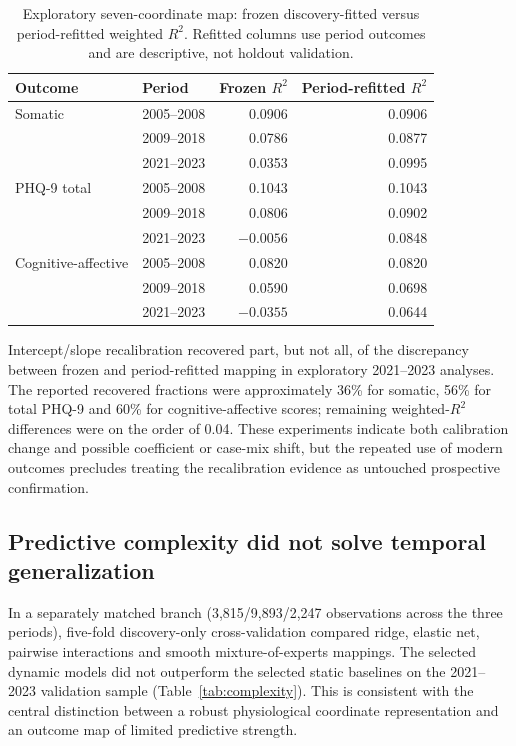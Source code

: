 \documentclass[11pt,a4paper]{article}
\newcommand{\Rtwo}{R^{2}}
\begin{document}
\begin{table}[htbp]\centering\small
\caption{Exploratory seven-coordinate map: frozen discovery-fitted versus period-refitted weighted $\Rtwo$. Refitted columns use period outcomes and are descriptive, not holdout validation.}
\label{tab:transfer}
\begin{tabular}{llrr}\toprule
Outcome & Period & Frozen $\Rtwo$ & Period-refitted $\Rtwo$\\\midrule
Somatic & 2005--2008 & 0.0906 & 0.0906\\
 & 2009--2018 & 0.0786 & 0.0877\\
 & 2021--2023 & 0.0353 & 0.0995\\\midrule
PHQ-9 total & 2005--2008 & 0.1043 & 0.1043\\
 & 2009--2018 & 0.0806 & 0.0902\\
 & 2021--2023 & $-0.0056$ & 0.0848\\\midrule
Cognitive-affective & 2005--2008 & 0.0820 & 0.0820\\
 & 2009--2018 & 0.0590 & 0.0698\\
 & 2021--2023 & $-0.0355$ & 0.0644\\\bottomrule
\end{tabular}
\end{table}

Intercept/slope recalibration recovered part, but not all, of the discrepancy between frozen and period-refitted mapping in exploratory 2021--2023 analyses. The reported recovered fractions were approximately 36\% for somatic, 56\% for total PHQ-9 and 60\% for cognitive-affective scores; remaining weighted-$\Rtwo$ differences were on the order of 0.04. These experiments indicate both calibration change and possible coefficient or case-mix shift, but the repeated use of modern outcomes precludes treating the recalibration evidence as untouched prospective confirmation.

\subsection{Predictive complexity did not solve temporal generalization}
In a separately matched branch (3,815/9,893/2,247 observations across the three periods), five-fold discovery-only cross-validation compared ridge, elastic net, pairwise interactions and smooth mixture-of-experts mappings. The selected dynamic models did not outperform the selected static baselines on the 2021--2023 validation sample (Table~\ref{tab:complexity}). This is consistent with the central distinction between a robust physiological coordinate representation and an outcome map of limited predictive strength.
\end{document}
